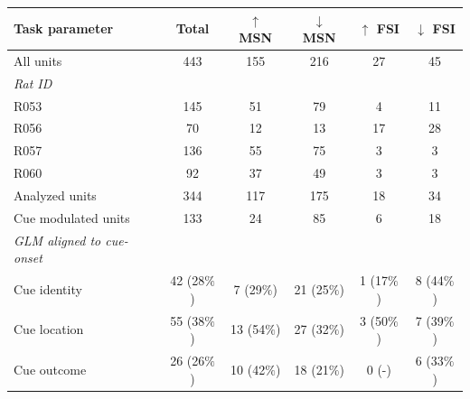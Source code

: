 \documentclass[11pt]{article}
\newcommand{\bsf}[1]{\textbf{#1}}
\begin{document}
\begin{table}[p]
\centering
\setlength{\tabcolsep}{1 em} %
\begin{tabular}{l c  c c c c}

\bsf{Task parameter}                                 & \bsf{Total}        & \bsf{$\uparrow$ MSN}        & \bsf{$\downarrow$ MSN}        & \bsf{$\uparrow$ FSI}       & \bsf{$\downarrow$ FSI}\\
\hline
All units                       & 443        & 155         & 216          & 27          & 45\\
\hline
\textit{Rat ID}                       &         &       &          &          &\\
\hline
\hspace{3mm}R053                       & 145         & 51          & 79          & 4         & 11\\
\hline
\hspace{3mm}R056                       & 70         & 12          & 13         & 17          & 28\\
\hline
\hspace{3mm}R057   	          & 136         & 55          & 75          & 3          & 3\\
\hline
\hspace{3mm}R060                       & 92         & 37          & 49          & 3          & 3\\
\hline 
Analyzed units                       & 344        & 117         & 175         & 18         & 34\\
\hline
Cue modulated units                      & 133         &24          &85          & 6          &18\\
\hline
\hspace{3mm}\textit{GLM aligned to cue-onset}                       &         &       &          &          &\\
\hline
\hspace{6mm}Cue identity       & 42 (28$\%$)        & 7 (29$\%$)          & 21 (25$\%$)          & 1 (17$\%$)          & 8 (44$\%$)\\
\hline
\hspace{6mm}Cue location       & 55 (38$\%$)       &13 (54$\%$)          & 27 (32$\%$)          & 3 (50$\%$)          & 7 (39$\%$)\\
\hline
\hspace{6mm}Cue outcome       & 26 (26$\%$)         & 10 (42$\%$)          & 18 (21$\%$)        & 0 (-)          & 6 (33$\%$)\\

\end{tabular}
\end{table}
\end{document}
